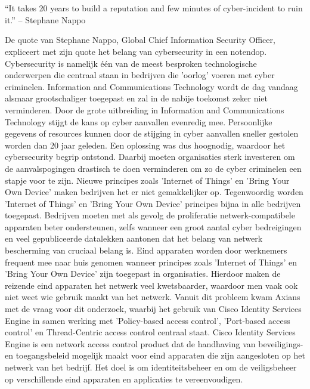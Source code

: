 
\chapter{}
\label{ch:inleiding}

\begin{displayquote}
	“It takes 20 years to build a reputation and few minutes of cyber-incident to ruin it.” – Stephane Nappo
\end{displayquote}

De quote van Stephane Nappo, Global Chief Information Security Officer, expliceert met zijn quote het belang van cybersecurity in een notendop. Cybersecurity is namelijk één van de meest besproken technologische onderwerpen die centraal staan in bedrijven die 'oorlog' voeren met cyber criminelen. Information and Communications Technology wordt de dag vandaag alsmaar grootschaliger toegepast en zal in de nabije toekomst zeker niet verminderen. Door de grote uitbreiding in Information and Communications Technology stijgt de kans op cyber aanvallen evenredig mee. Persoonlijke gegevens of resources kunnen door de stijging in cyber aanvallen sneller gestolen worden dan 20 jaar geleden. Een oplossing was dus hoognodig, waardoor het cybersecurity begrip ontstond. 
\newline
\newline
Daarbij moeten organisaties sterk investeren om de aanvalspogingen drastisch te doen verminderen om zo de cyber criminelen een stapje voor te zijn. Nieuwe principes zoals 'Internet of Things' en 'Bring Your Own Device' maken bedrijven het er niet gemakkelijker op. Tegenwoordig worden 'Internet of Things' en 'Bring Your Own Device' principes bijna in alle bedrijven toegepast. Bedrijven moeten met als gevolg de proliferatie netwerk-compatibele apparaten beter ondersteunen, zelfs wanneer een groot aantal cyber bedreigingen en veel gepubliceerde datalekken aantonen dat het belang van netwerk bescherming van cruciaal belang is. 
\newline
\newline
Eind apparaten worden door werknemers frequent mee naar huis genomen wanneer principes zoals 'Internet of Things' en 'Bring Your Own Device' zijn toegepast in organisaties. Hierdoor maken de reizende eind apparaten het netwerk veel kwetsbaarder, waardoor men vaak ook niet weet wie gebruik maakt van het netwerk. Vanuit dit probleem kwam Axians met de vraag voor dit onderzoek, waarbij het gebruik van Cisco Identity Services Engine in samen werking met 'Policy-based access control', 'Port-based access control' en Thread-Centric access control centraal staat. Cisco Identity Services Engine is een network access control product dat de handhaving van beveiligings- en toegangsbeleid mogelijk maakt voor eind apparaten die zijn aangesloten op het netwerk van het bedrijf. Het doel is om identiteitsbeheer en om de veiligsbeheer op verschillende eind apparaten en applicaties te vereenvoudigen. 
